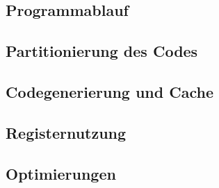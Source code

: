 \subsection{Programmablauf} %


\subsection{Partitionierung des Codes} %


\subsection{Codegenerierung und Cache} %


\subsection{Registernutzung} %


\subsection{Optimierungen} %

